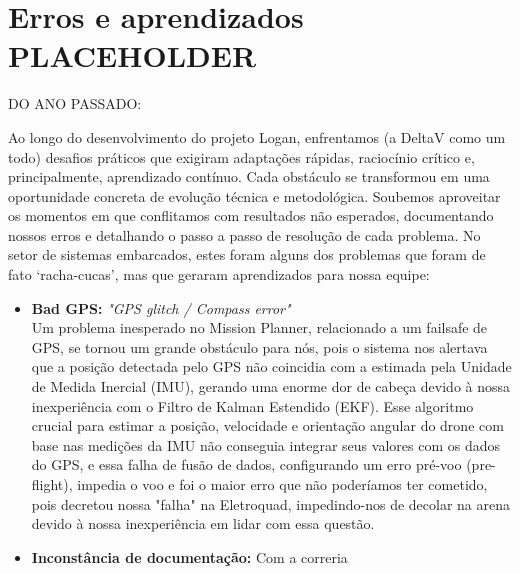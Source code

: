 \section{Erros e aprendizados PLACEHOLDER}

DO ANO PASSADO:

Ao longo do desenvolvimento do projeto Logan, enfrentamos (a DeltaV como um todo) desafios práticos que exigiram adaptações rápidas, raciocínio crítico e, principalmente, aprendizado contínuo. Cada obstáculo se transformou em uma oportunidade concreta de evolução técnica e metodológica. Soubemos aproveitar os momentos em que conflitamos com resultados não esperados, documentando nossos erros e detalhando o passo a passo de resolução de cada problema. No setor de sistemas embarcados, estes foram alguns dos problemas que foram de fato ‘racha-cucas', mas que geraram aprendizados para nossa equipe:

\begin{itemize}
    \item \textbf{Bad GPS:} \textit{"GPS glitch / Compass error"} \\ Um problema inesperado no Mission Planner, relacionado a um failsafe de GPS, se tornou um grande obstáculo para nós, pois o sistema nos alertava que a posição detectada pelo GPS não coincidia com a estimada pela Unidade de Medida Inercial (IMU), gerando uma enorme dor de cabeça devido à nossa inexperiência com o Filtro de Kalman Estendido (EKF). Esse algoritmo crucial para estimar a posição, velocidade e orientação angular do drone com base nas medições da IMU não conseguia integrar seus valores com os dados do GPS, e essa falha de fusão de dados, configurando um erro pré-voo (pre-flight), impedia o voo e foi o maior erro que não poderíamos ter cometido, pois decretou nossa "falha" na Eletroquad, impedindo-nos de decolar na arena devido à nossa inexperiência em lidar com essa questão.
    
    \item\textbf{Inconstância de documentação:} Com a correria 
    \end{itemize}


